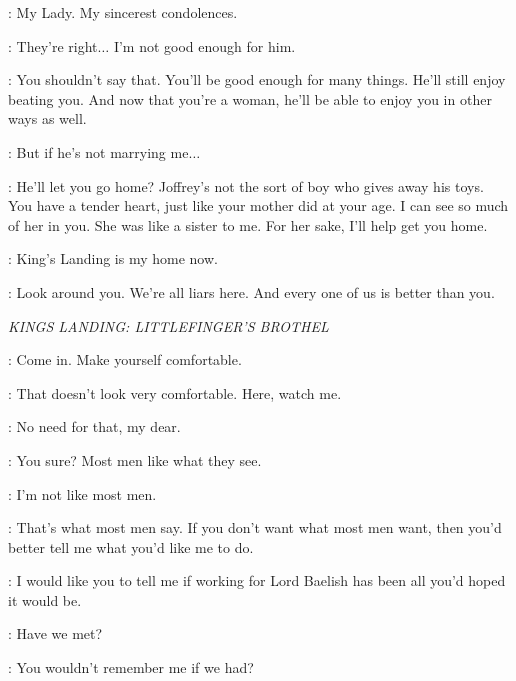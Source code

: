 \LITTLEFINGER: My Lady. My sincerest condolences. 

\SANSA: They're right$\ldots$ I'm not good enough for him. 

\LITTLEFINGER: You shouldn't say that. You'll be good enough for many things. He'll still enjoy beating you. And now that you're a woman, he'll be able to enjoy you in other ways as well. 

\SANSA: But if he's not marrying me$\ldots$  

\LITTLEFINGER: He'll let you go home? Joffrey's not the sort of boy who gives away his toys. You have a tender heart, just like your mother did at your age. I can see so much of her in you. She was like a sister to me. For her sake, I'll help get you home. 

\SANSA: King's Landing is my home now. 

\LITTLEFINGER: Look around you. We're all liars here. And every one of us is better than you. 


\scene

\textit{KINGS LANDING: LITTLEFINGER'S BROTHEL} 


\ROS: Come in. Make yourself comfortable. 


\ROS: That doesn't look very comfortable. Here, watch me. 


\VARYS: No need for that, my dear. 

\ROS: You sure? Most men like what they see. 

\VARYS: I'm not like most men. 

\ROS: That's what most men say.  If you don't want what most men want, then you'd better tell me what you'd like me to do. 

\VARYS: I would like you to tell me if working for Lord Baelish has been all you'd hoped it would be. 

\ROS: Have we met? 

\VARYS: You wouldn't remember me if we had? 

